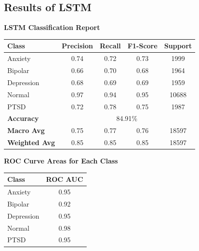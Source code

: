 \pagebreak


\subsection{Results of LSTM}

\begin{center}
    \textbf{LSTM Classification Report} \\[0.5em]
    \begin{tabular}{|l|c|c|c|c|}
        \hline
        \textbf{Class} & \textbf{Precision} & \textbf{Recall} & \textbf{F1-Score} & \textbf{Support} \\ \hline
        Anxiety        & 0.74               & 0.72            & 0.73              & 1999             \\ \hline
        Bipolar        & 0.66               & 0.70            & 0.68              & 1964             \\ \hline
        Depression     & 0.68               & 0.69            & 0.69              & 1959             \\ \hline
        Normal         & 0.97               & 0.94            & 0.95              & 10688            \\ \hline
        PTSD           & 0.72               & 0.78            & 0.75              & 1987             \\ \hline
        \textbf{Accuracy} & \multicolumn{4}{|c|}{84.91\%} \\ \hline
        \textbf{Macro Avg} & 0.75            & 0.77            & 0.76              & 18597            \\ \hline
        \textbf{Weighted Avg} & 0.85         & 0.85            & 0.85              & 18597            \\ \hline
    \end{tabular}
\end{center}

\vspace{0.1em}

\begin{center}
    \textbf{ROC Curve Areas for Each Class} \\[0.5em]
    \begin{tabular}{|l|c|}
        \hline
        \textbf{Class}  & \textbf{ROC AUC} \\ \hline
        Anxiety         & 0.95            \\ \hline
        Bipolar         & 0.92            \\ \hline
        Depression      & 0.95            \\ \hline
        Normal          & 0.98            \\ \hline
        PTSD            & 0.95            \\ \hline
    \end{tabular}
\end{center}


